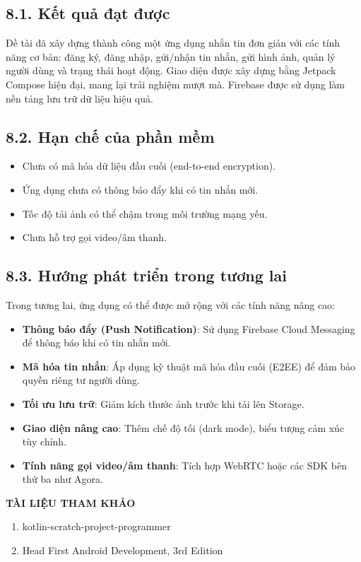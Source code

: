 \documentclass[12pt,a4paper]{article}
\begin{document}
	\subsection*{8.1. Kết quả đạt được}
	\vspace{0.1cm}
	
	\noindent
	Đề tài đã xây dựng thành công một ứng dụng nhắn tin đơn giản với các tính năng cơ bản: đăng ký, đăng nhập, gửi/nhận tin nhắn, gửi hình ảnh, quản lý người dùng và trạng thái hoạt động. Giao diện được xây dựng bằng Jetpack Compose hiện đại, mang lại trải nghiệm mượt mà. Firebase được sử dụng làm nền tảng lưu trữ dữ liệu hiệu quả.
	
	\vspace{0.7cm}
	
	\subsection*{8.2. Hạn chế của phần mềm}
	\vspace{0.1cm}
	
	\begin{itemize}
		\item Chưa có mã hóa dữ liệu đầu cuối (end-to-end encryption).
		\item Ứng dụng chưa có thông báo đẩy khi có tin nhắn mới.
		\item Tốc độ tải ảnh có thể chậm trong môi trường mạng yếu.
		\item Chưa hỗ trợ gọi video/âm thanh.
	\end{itemize}
	
	\vspace{0.7cm}
	
	\subsection*{8.3. Hướng phát triển trong tương lai}
	\vspace{0.1cm}
	
	\noindent
	Trong tương lai, ứng dụng có thể được mở rộng với các tính năng nâng cao:
	\begin{itemize}
		\item \textbf{Thông báo đẩy (Push Notification)}: Sử dụng Firebase Cloud Messaging để thông báo khi có tin nhắn mới.
		\item \textbf{Mã hóa tin nhắn}: Áp dụng kỹ thuật mã hóa đầu cuối (E2EE) để đảm bảo quyền riêng tư người dùng.
		\item \textbf{Tối ưu lưu trữ}: Giảm kích thước ảnh trước khi tải lên Storage.
		\item \textbf{Giao diện nâng cao}: Thêm chế độ tối (dark mode), biểu tượng cảm xúc tùy chỉnh.
		\item \textbf{Tính năng gọi video/âm thanh}: Tích hợp WebRTC hoặc các SDK bên thứ ba như Agora.
	\end{itemize}
	\noindent\textbf{\Large TÀI LIỆU THAM KHẢO}
	
	\vspace{0.5cm}
	
	\begin{enumerate}
		\item kotlin-scratch-project-programmer
		\item Head First Android Development, 3rd Edition
	\end{enumerate}
	
	
	
	
	
\end{document}
